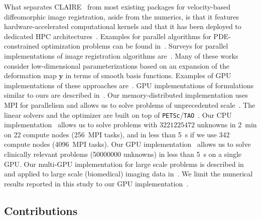 \documentclass[11pt]{amsart}
\renewcommand{\vec}[1]{\ensuremath{\boldsymbol{#1}}}
\newcommand\inum[1]{\num[scientific-notation=fixed,round-precision=0,round-mode=places,group-separator = {,}]{#1}}
\begin{document}
What separates CLAIRE~\cite{claireweb,Mang:2019a} from most existing packages for velocity-based diffeomorphic image registration, aside from the numerics, is that it features hardware-accelerated computational kernels and that it has been deployed to dedicated HPC architectures~\cite{Mang:2016b,Gholami:2017a,Mang:2019a,Brunn:2020a,Brunn:2021a}. Examples for parallel algorithms for PDE-constrained optimization problems can be found in~\cite{Akcelik:2002a,Akcelik:2006a,Biros:1999a,Biros:2005a,Biros:2005b,Biegler:2003a,Biegler:2007a,Schenk:2009a}. Surveys for parallel implementations of image registration algorithms are~\cite{Eklund:2013a,Fluck:2011a,Shackleford:2013a,Shams:2010a}. Many of these works consider low-dimensional parameterizations based on an expansion of the deformation map $\vec{y}$ in terms of smooth basis functions. Examples of GPU implementations of these approaches are~\cite{Shackleford:2010a,Modat:2010a,Shamonin:2014a}. GPU implementations of formulations similar to ours are described in~\cite{Ha:2009a,Ha:2011a,Sommer:2011a,Rehman:2009a,ValeroLara:2014a,Bone:2018a}. Our memory-distributed implementation uses MPI for parallelism and allows us to solve problems of unprecedented scale~\cite{Brunn:2020a,Mang:2016a,Gholami:2017a,Himthani:2022a}. The linear solvers and the optimizer are built on top of {\tt PETSc}/{\tt TAO}~\cite{Munson:2017a,Mills:2021a,petsc-web-page,petsc-user-ref}. Our CPU implementation~\cite{Mang:2019a,Mang:2016a,Gholami:2017a} allows us to solve problems with $\inum{3221225472}$ unknowns in \SI{2}{\minute} on 22 compute nodes (256~MPI tasks), and in less than \SI{5}{\second} if we use 342 compute nodes (\inum{4096}~MPI tasks). Our GPU implementation~\cite{Brunn:2020a,Brunn:2021a} allows us to solve clinically relevant problems (\inum{50000000} unknowns) in less than \SI{5}{\second} on a single GPU. Our multi-GPU implementation for large scale problems is described in~\cite{Brunn:2020a} and applied to large scale (biomedical) imaging data in~\cite{Himthani:2022a}. We limit the numerical results reported in this study to our GPU implementation~\cite{Brunn:2020a,Brunn:2021a}.




\subsection{Contributions}
\end{document}

